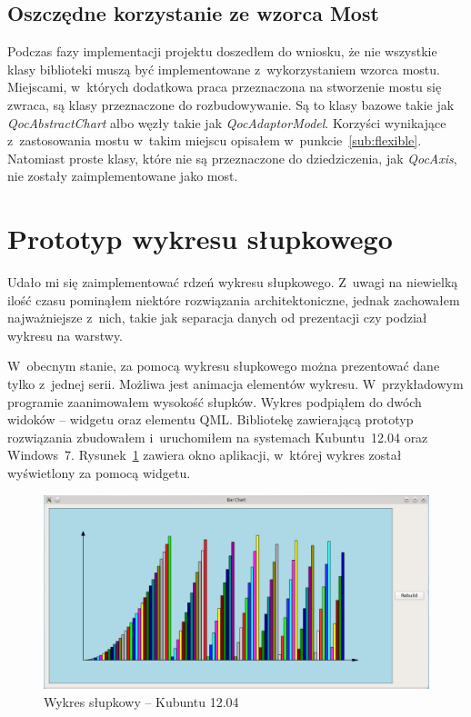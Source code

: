 \subsection{Oszczędne korzystanie ze wzorca Most}
Podczas fazy implementacji projektu doszedłem do wniosku, że nie wszystkie klasy biblioteki muszą być implementowane z~wykorzystaniem wzorca mostu. Miejscami, w~których dodatkowa praca przeznaczona na stworzenie mostu się zwraca, są klasy przeznaczone do rozbudowywanie. Są to klasy bazowe takie jak \textit{QocAbstractChart} albo węzły takie jak \textit{QocAdaptorModel}. Korzyści wynikające z~zastosowania mostu w~takim miejscu opisałem w~punkcie~\ref{sub:flexible}. Natomiast proste klasy, które nie są przeznaczone do dziedziczenia, jak \textit{QocAxis}, nie zostały zaimplementowane jako most.


\section{Prototyp wykresu słupkowego}
Udało mi się zaimplementować rdzeń wykresu słupkowego. Z~uwagi na niewielką ilość czasu pominąłem niektóre rozwiązania architektoniczne, jednak zachowałem najważniejsze z~nich, takie jak separacja danych od prezentacji czy podział wykresu na warstwy. 

W~obecnym stanie, za pomocą wykresu słupkowego można prezentować dane tylko z~jednej serii. Możliwa jest animacja elementów wykresu. W~przykładowym programie zaanimowałem wysokość słupków. Wykres podpiąłem do dwóch widoków -- widgetu oraz elementu QML. Bibliotekę zawierającą prototyp rozwiązania zbudowałem i~uruchomiłem na systemach Kubuntu~12.04 oraz Windows~7. Rysunek~\ref{rys:bar:kubuntu} zawiera okno aplikacji, w~której wykres został wyświetlony za pomocą widgetu.

\begin{figure}[H]
\centering
\includegraphics[scale=0.54]{img/BarChart_kubuntu.png}
\caption{Wykres słupkowy -- Kubuntu 12.04}\label{rys:bar:kubuntu}
\end{figure}

